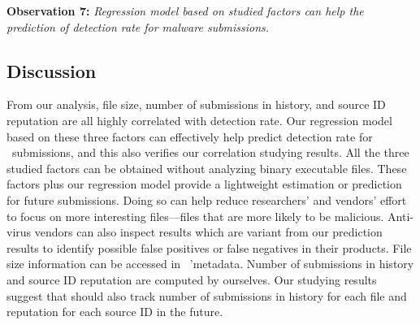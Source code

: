 {\bf Observation 7:} 
{\em Regression model based on studied factors can help the prediction of detection rate for malware submissions.}


\subsection{Discussion}


From our analysis, file size, number of submissions in history, 
and source ID reputation are all highly correlated with detection rate.
Our regression model based on these three factors can effectively help predict detection rate for \vt\ submissions, and this also verifies our correlation studying results. 
All the three studied factors can be obtained without analyzing binary executable files.
These factors plus our regression model provide a lightweight estimation or prediction for future submissions.  
Doing so can help reduce researchers' and vendors' effort to focus on more interesting files---files that are more likely to be malicious.
Anti-virus vendors can also inspect results which are variant from our prediction results 
to identify possible false positives or false negatives in their products. 
File size information can be accessed in \vt~'metadata. 
Number of submissions in history and source ID reputation are computed by ourselves. 
Our studying results suggest that \vt should also track number of submissions in history for each file and reputation for each source ID in the future. 

